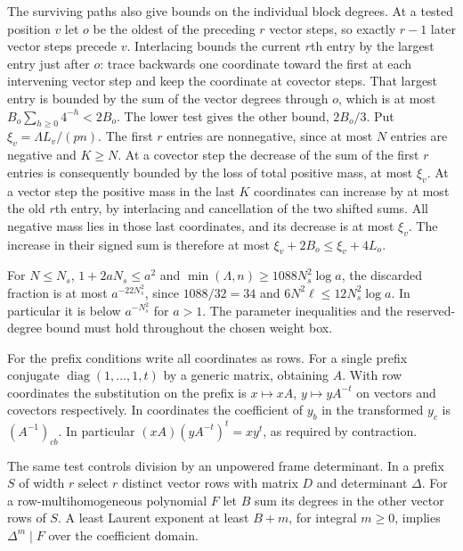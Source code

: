 \documentclass[11pt]{amsart}
\theoremstyle{definition}
\theoremstyle{remark}
\begin{document}
The surviving paths also give bounds on the individual block
degrees. At a tested position $v$ let $o$ be the oldest of the
preceding $r$ vector steps, so exactly $r-1$ later vector steps
precede $v$. Interlacing bounds the current $r$th entry by the
largest entry just after $o$: trace backwards one coordinate
toward the first at each intervening vector step and keep the
coordinate at covector steps. That largest entry is bounded by
the sum of the vector degrees through $o$, which is at most
$B_o\sum_{h\ge0}4^{-h}<2B_o$. The lower test gives the other
bound, $2B_o/3$. Put $\xi_v=\Lambda L_v/(pn)$.
The first $r$ entries are nonnegative, since at most $N$ entries
are negative and $K\ge N$. At a covector step the decrease of the
sum of the first $r$ entries is consequently bounded by the loss
of total positive mass, at most $\xi_v$. At a vector step the
positive mass in the last $K$ coordinates can increase by at most
the old $r$th entry, by interlacing and cancellation of the two
shifted sums. All negative mass lies in those last coordinates,
and its decrease is at most $\xi_v$. The increase in their signed
sum is therefore at most $\xi_v+2B_o\le\xi_v+4L_o$.

For $N\le N_s$, $1+2aN_s\le a^2$ and
$\min(\Lambda,n)\ge1088N_s^2\log a$, the discarded fraction
is at most $a^{-22N_s^2}$, since $1088/32=34$ and
$6N^2\ell\le12N_s^2\log a$. In particular it is below
$a^{-N_s^2}$ for $a>1$. The parameter inequalities and the
reserved-degree bound must hold throughout the chosen weight box.

For the prefix conditions write all coordinates as rows.
For a single prefix conjugate $\operatorname{diag}(1,\ldots,1,t)$
by a generic matrix, obtaining $A$. With row coordinates the
substitution on the prefix is $x\mapsto xA$, $y\mapsto yA^{-t}$
on vectors and covectors respectively. In coordinates the coefficient
of $y_b$ in the transformed $y_c$ is $(A^{-1})_{cb}$. In particular
$(xA)(yA^{-t})^t=xy^t$, as required by contraction.

The same test controls division by an unpowered frame determinant.
In a prefix $S$ of width $r$ select $r$ distinct vector rows with
matrix $D$ and determinant $\Delta$. For a row-multihomogeneous
polynomial $F$ let $B$ sum its degrees in the other vector rows
of $S$. A least Laurent exponent at least $B+m$, for integral
$m\ge0$, implies $\Delta^m\mid F$ over the coefficient domain.
\end{document}
